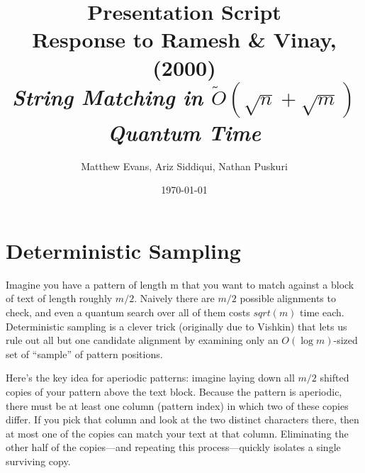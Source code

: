\documentclass[11pt]{article}
\title{Presentation Script \\ 
\Large{Response to Ramesh \& Vinay, (2000)\\ 
\small{\textit{String Matching in \(\tilde{O}(\sqrt{n} + \sqrt{m})\) Quantum Time}} }}
\author{%
\normalsize{Matthew Evans, Ariz Siddiqui, Nathan Puskuri}
}
\date{\today}
\begin{document}
\maketitle

\section*{Deterministic Sampling}
Imagine you have a pattern of length m that you want to match against a block of text of length roughly \(m/2\). Naively there are \(m/2\) possible alignments to check, and even a quantum search over all of them costs \(sqrt(m)\) time each. Deterministic sampling is a clever trick (originally due to Vishkin) that lets us rule out all but one candidate alignment by examining only an \(O(\log m)\)-sized set of ``sample'' of pattern positions.

Here's the key idea for aperiodic patterns: imagine laying down all \(m/2\) shifted copies of your pattern above the text block. Because the pattern is aperiodic, there must be at least one column (pattern index) in which two of these copies differ. If you pick that column and look at the two distinct characters there, then at most one of the copies can match your text at that column. Eliminating the other half of the copies—and repeating this process—quickly isolates a single surviving copy.
\end{document}
